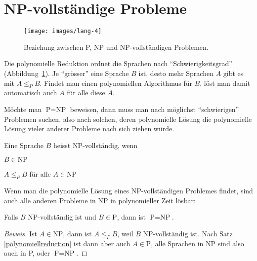 %
%
%
\section{NP-vollständige Probleme}
\begin{figure}
\begin{center}
\texttt{[image: images/lang-4]}
\end{center}
\caption{Beziehung zwischen P, NP und NP-vollständigen Problemen.
\label{pnpnpcomplete}}
\end{figure}%
Die polynomielle Reduktion ordnet die Sprachen nach ``Schwierigkeitsgrad''
(Abbildung~\ref{pnpnpcomplete}).
Je ``grösser'' eine Sprache $B$ ist, desto mehr Sprachen $A$ gibt es
mit $A\le_P B$.
Findet man einen polynomiellen Algorithmus für $B$,
löst man damit automatisch auch $A$ für alle diese $A$.

Möchte man $\text{P} = \text{NP}$ beweisen, dann muss man nach
möglichst ``schwierigen'' Problemen suchen, also nach solchen,
deren polynomielle Lösung die polynomielle Lösung vieler anderer
Probleme nach sich ziehen würde.

\begin{definition}
%
Eine Sprache $B$ heisst NP-vollständig, wenn 
\begin{compactenum}
\item $B\in\text{NP}$
\item $A\le_P B$ für alle $A\in\text{NP}$
\end{compactenum}
\end{definition}

Wenn man die polynomielle Lösung eines NP-vollständigen Problemes
findet, sind auch alle anderen Probleme in NP in polynomieller Zeit
lösbar:

\begin{satz}
Falls $B$ NP-vollständig ist und $B\in\text{P}$, dann ist
$\text{P}=\text{NP}$.
\end{satz}

\begin{proof}[Beweis]
Ist $A\in\text{NP}$, dann ist $A\le_P B$, weil $B$ NP-vollständig ist.
Nach Satz \ref{polynomiellreduction} ist dann aber auch
$A\in\text{P}$, alle Sprachen
in NP sind also auch in P, oder $\text{P}=\text{NP}$.
\end{proof}

